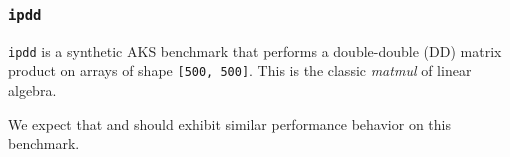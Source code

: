 \subsubsection{\tt ipdd}
\label{benchmarkipdd}

{\tt ipdd} is a synthetic AKS benchmark that performs
a double-double ({\apl D\qplus\qdot\qtimes\qtran\0D}) matrix product on 
arrays of shape {\tt [500, 500]}. This is the classic
{\em matmul} of linear algebra.

We expect that \wlf and \awlf should exhibit similar performance
behavior on this benchmark.
